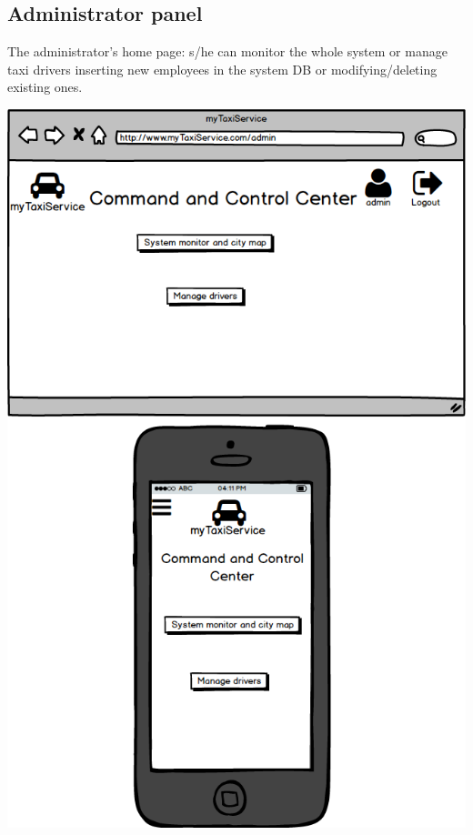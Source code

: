 \documentclass[a4paper,11pt]{report} %
\begin{document}
	\subsection{Administrator panel} The administrator's home page: s/he can monitor the whole system or manage taxi drivers inserting new employees in the system DB or modifying/deleting existing ones.
	\begin{center}
		\includegraphics[width=0.9\linewidth]{Pictures/AdminPage}
	\end{center}
	\pagebreak	
	
\end{document}
